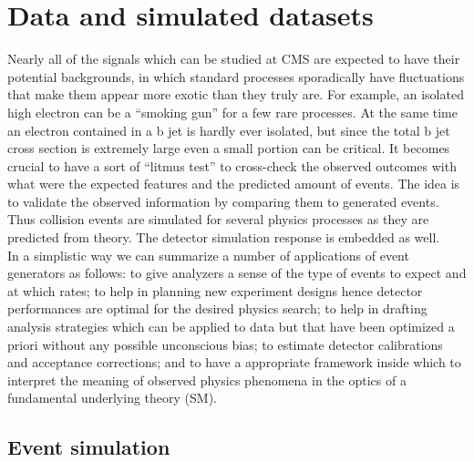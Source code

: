 \chapter{Data and simulated datasets} \label{Chapter4} 


Nearly all of the signals which can be studied at CMS are
expected to have their potential backgrounds, in which standard
processes sporadically have fluctuations that make them appear more exotic than they truly are.
For example, an isolated high \pt electron can be a ``smoking gun'' for
a few rare processes. At the same time an electron contained in a b
jet is hardly ever isolated, but since the total b jet cross section
is extremely large even a small portion can be critical. It becomes
crucial to have a sort of ``litmus test'' to cross-check the observed
outcomes with what were the expected features and the predicted amount of events.
The idea is to validate the observed information by comparing them to
generated events. Thus collision events are simulated for
several physics processes as they are predicted from theory. The
detector simulation response is embedded as well. \\
In a simplistic way we can summarize a number of applications of event
generators as follows: to give analyzers a sense of the type of
events to expect and at which rates; to help in planning new
experiment designs hence detector performances are optimal for the
desired physics search; to help in drafting analysis strategies which
can be applied to data but that have been optimized a priori without
any possible unconscious bias; to estimate detector calibrations and acceptance
corrections; and to have a appropriate framework inside which to
interpret the meaning of observed physics phenomena in the optics of a
fundamental underlying theory (SM).



\section{Event simulation}\label{sec:c4eventsimulation}


